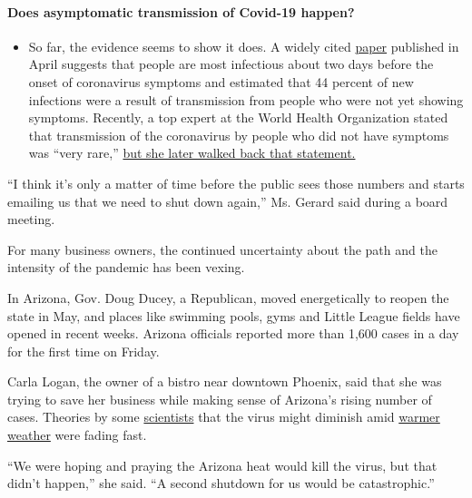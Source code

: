 \begin{itemize}
{  \paragraph{Does asymptomatic transmission of Covid-19
  happen?}\label{does-asymptomatic-transmission-of-covid-19-happen}}

  \begin{itemize}
  \tightlist
  \item
    So far, the evidence seems to show it does. A widely cited
    \href{https://www.nature.com/articles/s41591-020-0869-5}{paper}
    published in April suggests that people are most infectious about
    two days before the onset of coronavirus symptoms and estimated that
    44 percent of new infections were a result of transmission from
    people who were not yet showing symptoms. Recently, a top expert at
    the World Health Organization stated that transmission of the
    coronavirus by people who did not have symptoms was ``very rare,''
    \href{https://www.nytimes.com/2020/06/09/world/coronavirus-updates.html?action=click\&pgtype=Article\&state=default\&region=MAIN_CONTENT_3\&context=storylines_faq\#link-1f302e21}{but
    she later walked back that statement.}
  \end{itemize}
\end{itemize}

``I think it's only a matter of time before the public sees those
numbers and starts emailing us that we need to shut down again,'' Ms.
Gerard said during a board meeting.

For many business owners, the continued uncertainty about the path and
the intensity of the pandemic has been vexing.

In Arizona, Gov. Doug Ducey, a Republican, moved energetically to reopen
the state in May, and places like swimming pools, gyms and Little League
fields have opened in recent weeks. Arizona officials reported more than
1,600 cases in a day for the first time on Friday.

Carla Logan, the owner of a bistro near downtown Phoenix, said that she
was trying to save her business while making sense of Arizona's rising
number of cases. Theories by some
\href{https://www.nytimes.com/interactive/2020/05/21/opinion/coronavirus-warm-weather-summer-infections.html}{scientists}
that the virus might diminish amid
\href{https://directorsblog.nih.gov/2020/06/02/will-warm-weather-slow-spread-of-novel-coronavirus/}{warmer
weather} were fading fast.

``We were hoping and praying the Arizona heat would kill the virus, but
that didn't happen,'' she said. ``A second shutdown for us would be
catastrophic.''


